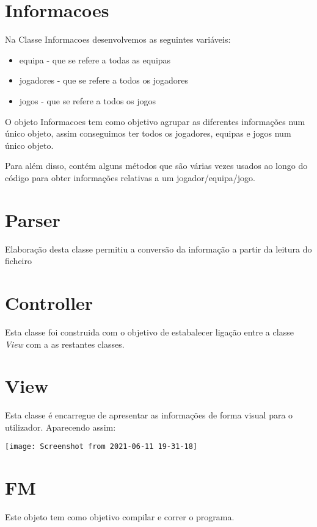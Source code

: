 \documentclass[a4paper,12pt]{article}
\begin{document}
\section{Informacoes}
    Na Classe Informacoes desenvolvemos as seguintes variáveis:
    \begin{itemize}
        \item equipa - que se refere a todas as equipas
        \item jogadores - que se refere a todos os jogadores
        \item jogos - que se refere a todos os jogos
    \end{itemize} \par
    O objeto Informacoes tem como objetivo agrupar as diferentes informações num único objeto, assim conseguimos ter
todos os jogadores, equipas e jogos num único objeto. \par
    Para além disso, contém alguns métodos que são várias vezes usados ao longo do código para obter informações
relativas a um jogador/equipa/jogo.

\section{Parser}
    Elaboração desta classe permitiu a conversão da informação a partir da leitura do ficheiro

\section{Controller}
    Esta classe foi construida com o objetivo de estabalecer ligação entre a classe \emph{View} com a as restantes
classes.

\newpage

\section{View}
    Esta classe é encarregue de apresentar as informações de forma visual para o utilizador.
    Aparecendo assim:
    \begin{center}
        \vspace*{1cm}
        \texttt{[image: Screenshot from 2021-06-11 19-31-18]}
    \end{center}

\section{FM}
Este objeto tem como objetivo compilar e correr o programa.\par
\end{document}
